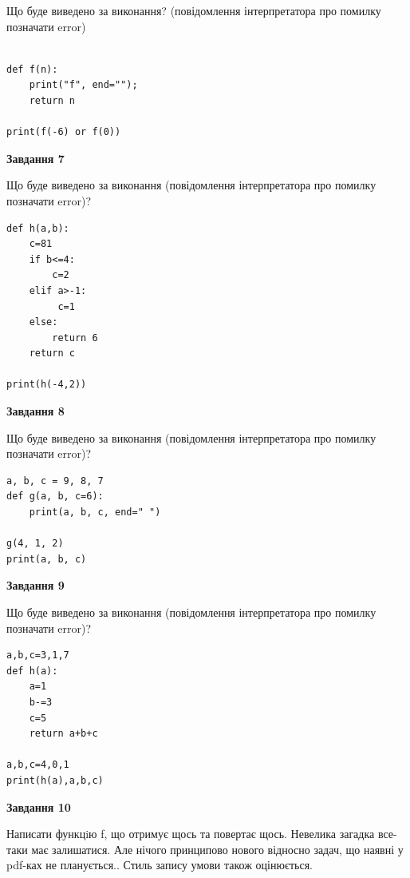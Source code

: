 \documentclass[12pt, ukrainian]{article}
\begin{document}
{\begin {large}
Що буде виведено за виконання? (повідомлення інтерпретатора про помилку позначати error)\par
\begin{verbatim}

def f(n):
    print("f", end="");
    return n

print(f(-6) or f(0))
\end{verbatim}

{\begin {center}\textbf{Завдання 7}\end {center}}

Що буде виведено за виконання (повідомлення інтерпретатора про помилку позначати error)?\par
\begin{verbatim}
def h(a,b):
    c=81
    if b<=4:
        c=2
    elif a>-1:
         c=1
    else: 
        return 6
    return c

print(h(-4,2))
\end{verbatim}

{\begin {center}\textbf{Завдання 8}\end {center}}

Що буде виведено за виконання (повідомлення інтерпретатора про помилку позначати error)?\par
\begin{verbatim}
a, b, c = 9, 8, 7
def g(a, b, c=6):
    print(a, b, c, end=" ")

g(4, 1, 2)
print(a, b, c)
\end{verbatim}

{\begin {center}\textbf{Завдання 9}\end {center}}

Що буде виведено за виконання (повідомлення інтерпретатора про помилку позначати error)?\par
\begin{verbatim}
a,b,c=3,1,7
def h(a):
    a=1
    b-=3
    c=5
    return a+b+c

a,b,c=4,0,1
print(h(a),a,b,c)
\end{verbatim}

{\begin {center}\textbf{Завдання 10}\end {center}}


Написати функцiю f, що отримує щось та повертає щось. Невелика загадка все-таки має залишатися. Але нічого принципово нового відносно задач, що наявні у pdf-ках не планується.. Стиль запису умови також оцінюється.\par
\end {large}}
\newpage
\end{document}
